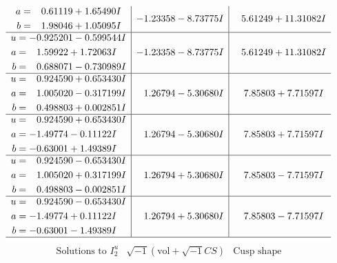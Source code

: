 \documentclass[1p]{elsarticle_modified}
\theoremstyle{definition}
\newcommand{\I}{\sqrt{-1}}
\begin{document}
$$\begin{array}{c|c|c}
\begin{aligned}
a &= \phantom{-}0.61119 + 1.65490 I \\
b &= \phantom{-}1.98046 + 1.05095 I\end{aligned}
 & -1.23358 - 8.73775 I & \phantom{-}5.61249 + 11.31082 I \\ \hline\begin{aligned}
u &= -0.925201 - 0.599544 I \\
a &= \phantom{-}1.59922 + 1.72063 I \\
b &= \phantom{-}0.688071 - 0.730989 I\end{aligned}
 & -1.23358 - 8.73775 I & \phantom{-}5.61249 + 11.31082 I \\ \hline\begin{aligned}
u &= \phantom{-}0.924590 + 0.653430 I \\
a &= \phantom{-}1.005020 - 0.317199 I \\
b &= \phantom{-}0.498803 + 0.002851 I\end{aligned}
 & \phantom{-}1.26794 - 5.30680 I & \phantom{-}7.85803 + 7.71597 I \\ \hline\begin{aligned}
u &= \phantom{-}0.924590 + 0.653430 I \\
a &= -1.49774 - 0.11122 I \\
b &= -0.63001 + 1.49389 I\end{aligned}
 & \phantom{-}1.26794 - 5.30680 I & \phantom{-}7.85803 + 7.71597 I \\ \hline\begin{aligned}
u &= \phantom{-}0.924590 - 0.653430 I \\
a &= \phantom{-}1.005020 + 0.317199 I \\
b &= \phantom{-}0.498803 - 0.002851 I\end{aligned}
 & \phantom{-}1.26794 + 5.30680 I & \phantom{-}7.85803 - 7.71597 I \\ \hline\begin{aligned}
u &= \phantom{-}0.924590 - 0.653430 I \\
a &= -1.49774 + 0.11122 I \\
b &= -0.63001 - 1.49389 I\end{aligned}
 & \phantom{-}1.26794 + 5.30680 I & \phantom{-}7.85803 - 7.71597 I\\
 \hline 
 \end{array}$$\newpage$$\begin{array}{c|c|c}  
\text{Solutions to }I^u_{2}& \I (\text{vol} + \sqrt{-1}CS) & \text{Cusp shape}\\
 \hline 
\begin{aligned}

\end{aligned}
\end{array}$$
\end{document}
